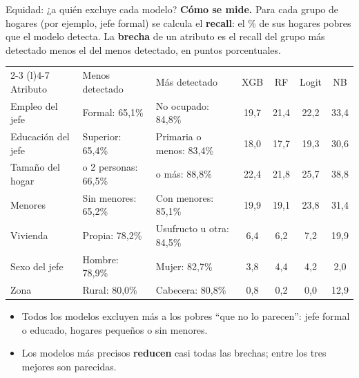 \documentclass[aspectratio=169,10pt,xcolor=table]{beamer}
\begin{document}
\begin{frame}{Equidad: ¿a quién excluye cada modelo?}
\footnotesize
\textbf{Cómo se mide.} Para cada grupo de hogares (por ejemplo, jefe formal)
se calcula el \textbf{recall}: el \% de sus hogares pobres que el modelo
detecta. La \textbf{brecha} de un atributo es el recall del grupo más
detectado menos el del menos detectado, en puntos porcentuales.
\vspace{2mm}

\scriptsize
\setlength{\tabcolsep}{4pt}
\begin{tabular}{@{}l>{\raggedright\arraybackslash}p{3.0cm}>{\raggedright\arraybackslash}p{3.0cm}cccc@{}}
\toprule
& \multicolumn{2}{c}{Recall del XGBoost final por grupo} & \multicolumn{4}{c}{Brecha (pp)} \\
\cmidrule(lr){2-3} \cmidrule(l){4-7}
Atributo & Menos detectado & Más detectado & \textcolor{cxgb}{XGB} & \textcolor{crf}{RF} & \textcolor{clogit}{Logit} & NB \\
\midrule
Empleo del jefe    & Formal: 65,1\%           & No ocupado: 84,8\%        & 19,7 & 21,4 & 22,2 & 33,4 \\
Educación del jefe & Superior: 65,4\%         & Primaria o menos: 83,4\%  & 18,0 & 17,7 & 19,3 & 30,6 \\
Tamaño del hogar   & 1 o 2 personas: 66,5\%   & 5 o más: 88,8\%           & 22,4 & 21,8 & 25,7 & 38,8 \\
Menores            & Sin menores: 65,2\%      & Con menores: 85,1\%       & 19,9 & 19,1 & 23,8 & 31,4 \\
Vivienda           & Propia: 78,2\%           & Usufructo u otra: 84,5\%  & 6,4  & 6,2  & 7,2  & 19,9 \\
Sexo del jefe      & Hombre: 78,9\%           & Mujer: 82,7\%             & 3,8  & 4,4  & 4,2  & 2,0 \\
Zona               & Rural: 80,0\%            & Cabecera: 80,8\%          & 0,8  & 0,2  & 0,0  & 12,9 \\
\bottomrule
\end{tabular}
\vspace{2mm}

\small
\begin{itemize}
  \item Todos los modelos excluyen más a los pobres ``que no lo parecen'':
    jefe formal o educado, hogares pequeños o sin menores.
  \item Los modelos más precisos \textbf{reducen} casi todas las brechas;
    entre los tres mejores son parecidas.
\end{itemize}
\end{frame}
\end{document}
